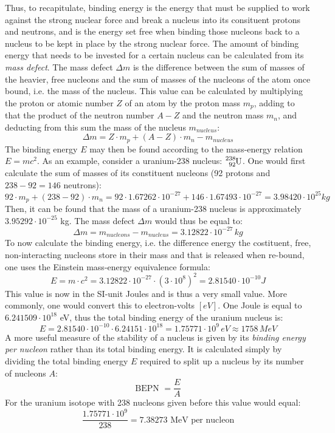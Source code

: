 Thus, to recapitulate, binding energy is the energy that must be supplied to work against the strong nuclear force and break a nucleus into its consituent protons and neutrons, and is the energy set free when binding those nucleons back to a nucleus to be kept in place by the strong nuclear force. The amount of binding energy that needs to be invested for a certain nucleus can be calculated from its \emph{mass defect}. The mass defect $\Delta m$ is the difference between the sum of masses of the heavier, free nucleons and the sum of masses of the nucleons of the atom once bound, i.e. the mass of the nucleus. This value can be calculated by multiplying the proton or atomic number $Z$ of an atom by the proton mass $m_p$, adding to that the product of the neutron number $A - Z$ and the neutron mass $m_n$, and deducting from this sum the mass of the nucleus $m_{nucleus}$: $$\Delta m = Z \cdot m_p + (A - Z) \cdot m_n - m_{nucleus}$$ The binding energy $E$ may then be found according to the mass-energy relation $E = mc^2$. As an example, consider a uranium-238 nucleus: $\ce{^238_92U}$. One would first calculate the sum of masses of its constituent nucleons (92 protons and $238 - 92 = 146$ neutrons): $$92 \cdot m_p + (238 - 92) \cdot m_n = 92 \cdot 1.67262 \cdot 10^{-27} + 146 \cdot 1.67493 \cdot 10^{−27} = 3.98420 \cdot 10^{25} kg$$ Then, it can be found that the mass of a uranium-238 nucleus is approximately $3.95292 \cdot 10^{-25}$ kg. The mass defect $\Delta m$ would thus be equal to: $$\Delta m = m_{nucleons} - m_{nucleus} = 3.12822 \cdot 10^{-27}\, kg$$ To now calculate the binding energy, i.e. the difference energy the costituent, free, non-interacting nucleons store in their mass and that is released when re-bound, one uses the Einstein mass-energy equivalence formula: $$E = m \cdot c^2 = 3.12822 \cdot 10^{-27} \cdot (3 \cdot 10^8)^2 = 2.81540 \cdot 10^{-10} J$$ This value is now in the SI-unit Joules and is thus a very small value. More commonly, one would convert this to electron-volts $[eV]$. One Joule is equal to $6.241509 \cdot 10^18$ eV, thus the total binding energy of the uranium nucleus is: $$E = 2.81540 \cdot 10^{-10} \cdot 6.24151 \cdot 10^18 = 1.75771 \cdot 10^{9}\, eV \approx 1758\, MeV$$ A more useful measure of the stability of a nucleus is given by its \emph{binding energy per nucleon} rather than its total binding energy. It is calculated simply by dividing the total binding energy $E$ required to split up a nucleus by its number of nucleons $A$: $$\text{BEPN } = \frac{E}{A}$$ For the uranium isotope with 238 nucleons given before this value would equal: $$\frac{1.75771 \cdot 10^{9}}{238} = 7.38273 \text{ MeV per nucleon}$$
